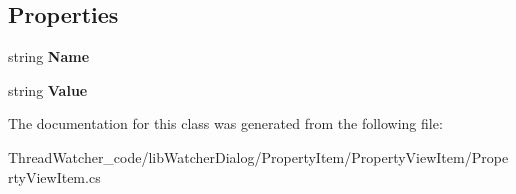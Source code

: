 \subsection*{Properties}
\begin{DoxyCompactItemize}
\item 
\hypertarget{classlib_watcher_dialog_1_1_property_item_1_1_property_view_item_1_1_property_view_item_a0bad2b58c0b7391d39efcfab04e26d6a}{string {\bfseries Name}}\label{classlib_watcher_dialog_1_1_property_item_1_1_property_view_item_1_1_property_view_item_a0bad2b58c0b7391d39efcfab04e26d6a}

\item 
\hypertarget{classlib_watcher_dialog_1_1_property_item_1_1_property_view_item_1_1_property_view_item_a7ed127b4f73fe6c29acf5b6cdd2d87d8}{string {\bfseries Value}}\label{classlib_watcher_dialog_1_1_property_item_1_1_property_view_item_1_1_property_view_item_a7ed127b4f73fe6c29acf5b6cdd2d87d8}

\end{DoxyCompactItemize}


The documentation for this class was generated from the following file\+:\begin{DoxyCompactItemize}
\item 
Thread\+Watcher\+\_\+code/lib\+Watcher\+Dialog/\+Property\+Item/\+Property\+View\+Item/Property\+View\+Item.\+cs\end{DoxyCompactItemize}
